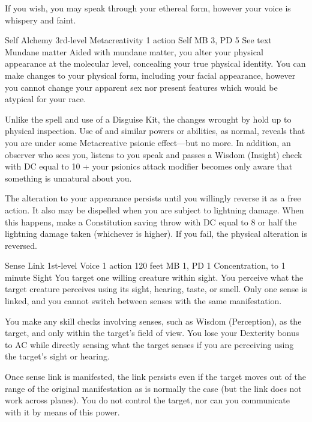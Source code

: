 If you wish, you may speak through your ethereal form, however
your voice is whispery and faint.

\DndPowerHeader%
    {Self Alchemy\label{pwr:self-alchemy}}
    {3rd-level Metacreativity}
    {1 action}
    {Self}
    {MB 3, PD 5}
    {See text}
    {Mundane matter}
Aided with mundane matter, you alter your physical appearance
at the molecular level, concealing your true physical identity.
You can make changes to your physical form, including your facial
appearance, however you cannot change your apparent sex nor
present features which would be atypical for your race.

Unlike the  spell and use of a Disguise Kit,
the changes wrought by  hold up to
physical inspection. Use of 
and similar powers or abilities, as normal,
reveals that you are under some Metacreative psionic effect---but no more.
In addition, an observer who sees you, listens to you speak and passes
a Wisdom (Insight) check with DC equal to 10 + your psionics attack
modifier becomes only aware that something is unnatural about you.

The alteration to your appearance persists until you willingly
reverse it as a free action. It also may be dispelled when you are subject
to lightning damage. When this happens, make a Constitution saving
throw with DC equal to 8 or half the lightning damage taken
(whichever is higher). If you fail, the physical alteration is reversed.

\DndPowerHeader%
    {Sense Link\label{pwr:sense-link}}
    {1st-level Voice}
    {1 action}
    {120 feet}
    {MB 1, PD 1}
    {Concentration, to 1 minute}
    {Sight}
You target one willing creature within sight.
You perceive what the target creature perceives using its
sight, hearing, taste, or smell. Only one sense is linked,
and you cannot switch between senses with the same manifestation.

You make any skill checks involving senses, such as Wisdom
(Perception), as the target, and only within the target's
field of view. You lose your Dexterity bonus to AC while directly
sensing what the target senses if you are perceiving using
the target's sight or hearing.

Once sense link is manifested, the link persists even if the
target moves out of the range of the original manifestation
as is normally the case (but the link does not work across
planes). You do not control the target, nor can you communicate
with it by means of this power.

